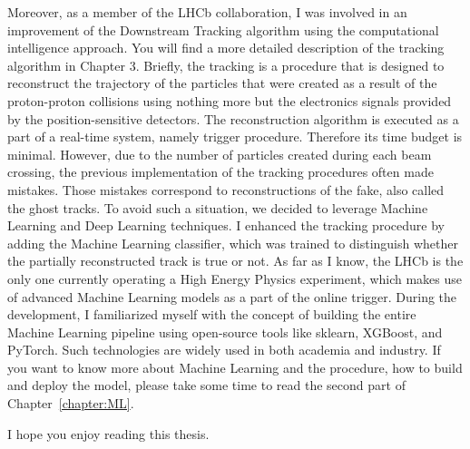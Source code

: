 Moreover, as a member of the LHCb collaboration, I was involved in an improvement of the Downstream Tracking algorithm using the computational intelligence approach. You will find a more detailed description of the tracking algorithm in Chapter 3. Briefly, the tracking is a procedure that is designed to reconstruct the trajectory of the particles that were created as a result of the proton-proton collisions using nothing more but the electronics signals provided by the position-sensitive detectors. The reconstruction algorithm is executed as a part of a real-time system, namely trigger procedure. Therefore its time budget is minimal. However, due to the number of particles created during each beam crossing, the previous implementation of the tracking procedures often made mistakes. Those mistakes correspond to reconstructions of the fake, also called the ghost tracks. To avoid such a situation, we decided to leverage Machine Learning and Deep Learning techniques. I enhanced the tracking procedure by adding the Machine Learning classifier, which was trained to distinguish whether the partially reconstructed track is true or not. As far as I know, the LHCb is the only one currently operating a High Energy Physics experiment, which makes use of advanced Machine Learning models as a part of the online trigger. During the development, I familiarized myself with the concept of building the entire Machine Learning pipeline using open-source tools like sklearn, XGBoost, and PyTorch. Such technologies are widely used in both academia and industry. If you want to know more about Machine Learning and the procedure, how to build and deploy the model, please take some time to read the second part of Chapter~\ref{chapter:ML}. 


I hope you enjoy reading this thesis. 

